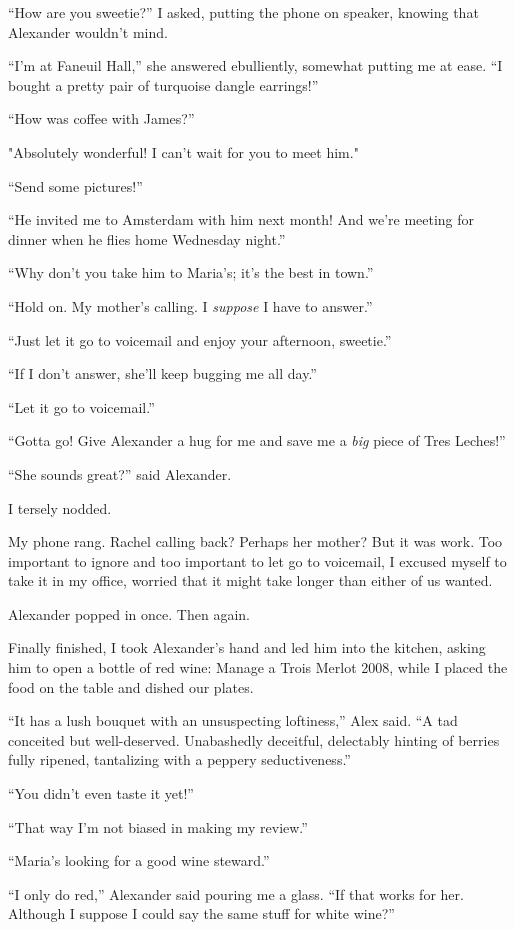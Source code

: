 ``How are you sweetie?'' I asked, putting the phone on speaker, knowing
that Alexander wouldn't mind.

``I'm at Faneuil Hall,'' she answered ebulliently, somewhat putting me
at ease. ``I bought a pretty pair of turquoise dangle earrings!''

``How was coffee with James?''

"Absolutely wonderful! I can't wait for you to meet him."

``Send some pictures!''

``He invited me to Amsterdam with him next month! And we're meeting for
dinner when he flies home Wednesday night.''

``Why don't you take him to Maria's; it's the best in town.''

``Hold on. My mother's calling. I \emph{suppose} I have to answer.''

``Just let it go to voicemail and enjoy your afternoon, sweetie.''

``If I don't answer, she'll keep bugging me all day.''

``Let it go to voicemail.''

``Gotta go! Give Alexander a hug for me and save me a \emph{big} piece
of Tres Leches!''

``She sounds great?'' said Alexander.

I tersely nodded.

My phone rang. Rachel calling back? Perhaps her mother? But it was work.
Too important to ignore and too important to let go to voicemail, I
excused myself to take it in my office, worried that it might take
longer than either of us wanted.

Alexander popped in once. Then again.

Finally finished, I took Alexander's hand and led him into the kitchen,
asking him to open a bottle of red wine: Manage a Trois Merlot 2008,
while I placed the food on the table and dished our plates.

``It has a lush bouquet with an unsuspecting loftiness,'' Alex said. ``A
tad conceited but well-deserved. Unabashedly deceitful, delectably
hinting of berries fully ripened, tantalizing with a peppery
seductiveness.''

``You didn't even taste it yet!''

``That way I'm not biased in making my review.''

``Maria's looking for a good wine steward.''

``I only do red,'' Alexander said pouring me a glass. ``If that works
for her. Although I suppose I could say the same stuff for white wine?''

